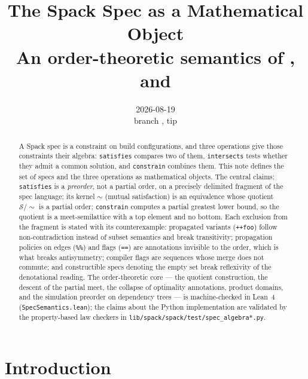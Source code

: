 \documentclass[11pt]{article}
\title{The Spack Spec as a Mathematical Object\\
\large An order-theoretic semantics of \code{satisfies}, \code{intersects} and \code{constrain}}
\author{}
\date{2026-08-19 \\ \small branch \code{hs/test/property-based-tests}, tip \code{475f06ecef4}}
\theoremstyle{definition}
\theoremstyle{remark}
\renewcommand{\ker}{\sim}
\newcommand{\Spec}{\mathcal{S}}
\newcommand{\code}[1]{\texttt{#1}}
\begin{document}
\maketitle

\begin{abstract}
\noindent
A Spack spec is a constraint on build configurations, and three operations give
those constraints their algebra: \code{satisfies} compares two of them,
\code{intersects} tests whether they admit a common solution, and
\code{constrain} combines them.  This note defines the set of specs and the
three operations as mathematical objects.  The central claims: \code{satisfies}
is a \emph{preorder}, not a partial order, on a precisely delimited fragment of
the spec language; its kernel $\ker$ (mutual satisfaction) is an equivalence
whose quotient $\Spec/\!\ker$ is a partial order; \code{constrain} computes a
partial greatest lower bound, so the quotient is a meet-semilattice with a top
element and no bottom.  Each exclusion from the fragment is stated with its
counterexample: propagated variants (\code{++foo}) follow non-contradiction
instead of subset semantics and break transitivity; propagation policies on
edges (\code{\%\%}) and flags (\code{==}) are annotations invisible to the
order, which is what breaks antisymmetry; compiler flags are sequences whose
merge does not commute; and constructible specs denoting the empty set break
reflexivity of the denotational reading.  The order-theoretic core --- the
quotient construction, the descent of the partial meet, the collapse of
optimality annotations, product domains, and the simulation preorder on
dependency trees --- is machine-checked in Lean~4
(\code{SpecSemantics.lean}); the claims about the Python implementation are
validated by the property-based law checkers in
\code{lib/spack/spack/test/spec\_algebra*.py}.
\end{abstract}

\tableofcontents

\section{Introduction}
\end{document}
